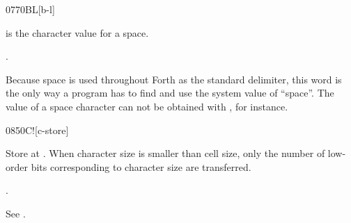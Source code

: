 \begin{worddef}{0770}{BL}[b-l]
\item {}

	 is the character value for a space.

\see {}.

	\begin{rationale} %
		Because space is used throughout Forth as the standard
		delimiter, this word is the only way a program has to find and
		use the system value of ``space''. The value of a space
		character can not be obtained with , for instance.
	\end{rationale}

	\begin{testing} %
	\end{testing}
\end{worddef}


\begin{worddef}{0850}{C!}[c-store]
\item {}

	Store  at . When character size is smaller
	than cell size, only the number of low-order bits corresponding to
	character size are transferred.

\see {}.

	\begin{testing} %
		See .
	\end{testing}
\end{worddef}


